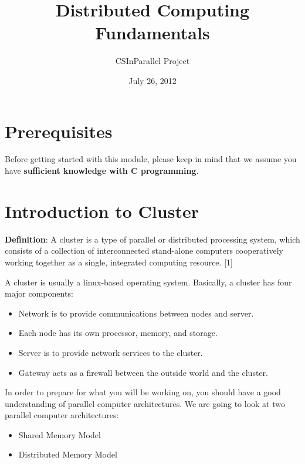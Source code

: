 \documentclass[letterpaper,10pt,openany,oneside]{sphinxmanual}
\title{Distributed Computing Fundamentals}
\date{July 26, 2012}
\author{CSInParallel Project}
\begin{document}
\maketitle
\tableofcontents
{}\label{index::doc}



\chapter{Prerequisites}
\label{Prerequisites/Prerequisites:prerequisites}\label{Prerequisites/Prerequisites:distributed-computing-fundamentals}\label{Prerequisites/Prerequisites::doc}
Before getting started with this module, please keep in mind that we assume you have \textbf{sufficient knowledge with C programming}.


\chapter{Introduction to Cluster}
\label{IntroCluster/IntroCluster:introduction-to-cluster}\label{IntroCluster/IntroCluster::doc}
\textbf{Definition}: A cluster is a type of parallel or distributed processing system, which consists of a collection of interconnected stand-alone computers cooperatively working together as a single, integrated computing resource. {[}1{]}

A cluster is usually a linux-based operating system. Basically, a cluster has four major components:
\begin{itemize}
\item {} 
Network is to provide communications between nodes and server.

\item {} 
Each node has its own processor, memory, and storage.

\item {} 
Server is to provide network services to the cluster.

\item {} 
Gateway acts as a firewall between the outside world and the cluster.

\end{itemize}

In order to prepare for what you will be working on, you should have a good understanding of parallel computer architectures. We are going to look at two parallel computer architectures:
\begin{itemize}
\item {} 
Shared Memory Model

\item {} 
Distributed Memory Model

\end{itemize}
\end{document}
